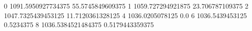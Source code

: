 0 1091.5950927734375 55.5745849609375
1 1059.727294921875 23.706787109375
2 1047.7325439453125 11.7120361328125
4 1036.0205078125 0.0
6 1036.5439453125 0.5234375
8 1036.5384521484375 0.5179443359375
